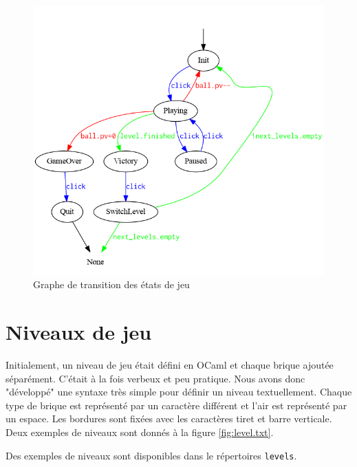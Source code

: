 \documentclass[french]{template}
\begin{document}
\begin{figure}
    \centering
    \includegraphics[width=\textwidth]{img/graph.png}
    \caption{Graphe de transition des états de jeu}
    \label{fig:graph}
\end{figure}

\section{Niveaux de jeu}

Initialement, un niveau de jeu était défini en OCaml et chaque brique ajoutée séparément. C'était à la fois verbeux et peu pratique. Nous avons donc "développé" une syntaxe très simple pour définir un niveau textuellement. Chaque type de brique est représenté par un caractère différent et l'air est représenté par un espace. Les bordures sont fixées avec les caractères tiret et barre verticale. Deux exemples de niveaux sont donnés à la figure \ref{fig:level.txt}.

Des exemples de niveaux sont disponibles dans le répertoires \texttt{levels}.
\end{document}
